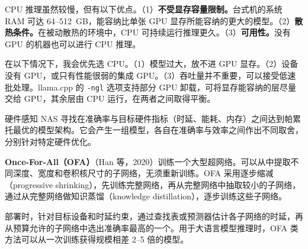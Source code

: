 \begin{interview}
CPU 推理虽然较慢，但有以下优点。（1）\textbf{不受显存容量限制。}台式机的系统 RAM 可达 64–512~GB，能容纳比单张 GPU 显存所能容纳的更大的模型。（2）\textbf{散热条件。}在被动散热的环境中，CPU 可持续运行推理更久。（3）\textbf{可用性。}没有 GPU 的机器也可以进行 CPU 推理。

在以下情况下，我会优先选 CPU。（1）模型过大，放不进 GPU 显存。（2）设备没有 GPU，或只有性能很弱的集成 GPU。（3）吞吐量并不重要，可以接受低速批处理。llama.cpp 的 \texttt{-ngl} 选项支持部分 GPU 卸载，可将显存能容纳的层尽量交给 GPU，其余层由 CPU 运行，在两者之间取得平衡。

硬件感知 NAS 寻找在准确率与目标硬件指标（时延、能耗、内存）之间达到帕累托最优的模型架构。它会产生一组模型，各自在准确率与效率之间作出不同取舍，分别针对特定硬件优化。

\textbf{Once-For-All（OFA）}（Han 等，2020）训练一个大型超网络。可以从中提取不同深度、宽度和卷积核尺寸的子网络，无须重新训练。OFA 采用逐步缩减（progressive shrinking），先训练完整网络，再从完整网络中抽取较小的子网络，通过从完整网络做知识蒸馏（knowledge distillation），逐步训练这些子网络。

部署时，针对目标设备和时延约束，通过查找表或预测器估计各子网络的时延，再从预算允许的子网络中选出准确率最高的一个。用于大语言模型推理时，OFA 类方法可以从一次训练获得规模相差 2–5 倍的模型。
\end{interview}
